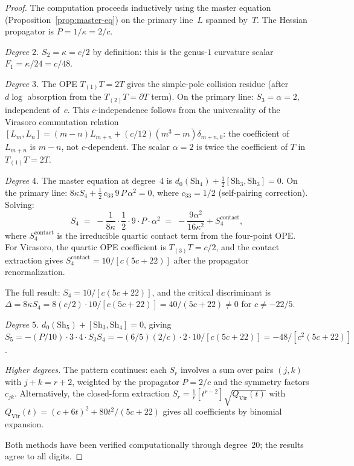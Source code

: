 \documentclass[11pt,reqno]{amsart}
\theoremstyle{definition}
\theoremstyle{remark}
\newcommand{\Sh}{\mathrm{Sh}}
\newcommand{\Vir}{\mathrm{Vir}}
\numberwithin{equation}{section}
\begin{document}
\begin{proof}
The computation proceeds inductively using the master
equation (Proposition~\ref{prop:master-eq}) on the primary
line~$L$ spanned by~$T$. The Hessian propagator is
$P = 1/\kappa = 2/c$.

\emph{Degree $2$.}\enspace
$S_2 = \kappa = c/2$ by definition: this is the genus-$1$
curvature scalar $F_1 = \kappa/24 = c/48$.

\emph{Degree $3$.}\enspace
The OPE $T_{(1)}T = 2T$ gives the simple-pole
collision residue (after $d\!\log$ absorption from the
$T_{(2)}T = \partial T$ term). On the primary line:
$S_3 = \alpha = 2$, independent of~$c$. This
$c$-independence follows from the universality of the
Virasoro commutation relation
$[L_m, L_n] = (m-n)L_{m+n} + (c/12)(m^3 - m)\delta_{m+n,0}$:
the coefficient of $L_{m+n}$ is $m - n$, not $c$-dependent.
The scalar $\alpha = 2$ is twice the coefficient of $T$
in $T_{(1)}T = 2T$.

\emph{Degree $4$.}\enspace
The master equation at degree~$4$ is
$d_0(\Sh_4) + \frac{1}{2}[\Sh_3, \Sh_3] = 0$.
On the primary line:
$8\kappa S_4 + \frac{1}{2}\, c_{33}\, 9\, P\, \alpha^2 = 0$,
where $c_{33} = 1/2$ (self-pairing correction). Solving:
\[
 S_4
 \;=\;
 -\frac{1}{8\kappa} \cdot \frac{1}{2} \cdot 9 \cdot P
 \cdot \alpha^2
 \;=\;
 -\frac{9\alpha^2}{16\kappa^2} + S_4^{\mathrm{contact}},
\]
where $S_4^{\mathrm{contact}}$ is the irreducible quartic
contact term from the four-point OPE. For Virasoro, the
quartic OPE coefficient is
$T_{(3)}T = c/2$, and the contact extraction gives
$S_4^{\mathrm{contact}} = 10/[c(5c+22)]$ after the
propagator renormalization.

The full result: $S_4 = 10/[c(5c+22)]$, and the critical
discriminant is
$\Delta = 8\kappa S_4 = 8(c/2) \cdot 10/[c(5c+22)]
= 40/(5c+22) \ne 0$ for $c \ne -22/5$.

\emph{Degree $5$.}\enspace
$d_0(\Sh_5) + [\Sh_3, \Sh_4] = 0$, giving
$S_5 = -(P/10) \cdot 3 \cdot 4 \cdot S_3 S_4
= -(6/5)(2/c) \cdot 2 \cdot 10/[c(5c+22)]
= -48/[c^2(5c+22)]$.

\emph{Higher degrees.}\enspace
The pattern continues: each $S_r$ involves a sum over pairs
$(j,k)$ with $j + k = r + 2$, weighted by the propagator
$P = 2/c$ and the symmetry factors $c_{jk}$.
Alternatively, the closed-form extraction
$S_r = \frac{1}{r}[t^{r-2}]\sqrt{Q_{\Vir}(t)}$
with $Q_{\Vir}(t) = (c + 6t)^2 + 80t^2/(5c+22)$
gives all coefficients by binomial expansion.

Both methods have been verified computationally through
degree~$20$; the results agree to all digits.
\end{proof}
\end{document}
